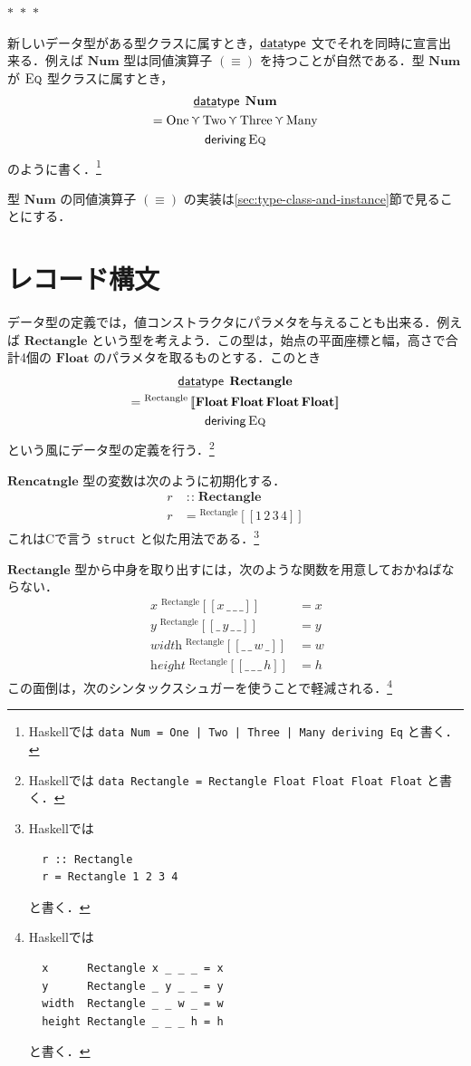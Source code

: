 \documentclass[a4paper,twocolumn]{jsbook}
\def\[{\left[\!\left[}
\def\]{\right]\!\right]}
\newcommand{\separator}{\begin{center}$*$~$*$~$*$\end{center}}
\newcommand{\programminglanguage}[1]{\textsf{#1}}
\newcommand{\clang}{\programminglanguage{C}}
\newcommand{\haskell}{\programminglanguage{Haskell}}
\newcommand{\code}[1]{\texttt{#1}}
\newcommand{\mKeyword}[1]{\mathsf{#1}} %
\newcommand{\mKeywordUnderline}[1]{\text{\underline{\textsf{#1}}}} %
\newcommand{\mDataTypeKeyword}{\mKeywordUnderline{data}\mKeyword{type}}
\newcommand{\mDerivingKeyword}{\mKeyword{deriving}}
\DeclareMathOperator{\mDataType}{\mDataTypeKeyword}
\DeclareMathOperator{\mDeriving}{\mDerivingKeyword}
\newcommand{\mSpecialConstant}[1]{\textrm{#1}} %
\newcommand{\mNumOne}{\mSpecialConstant{One}}
\newcommand{\mNumTwo}{\mSpecialConstant{Two}}
\newcommand{\mNumThree}{\mSpecialConstant{Three}}
\newcommand{\mNumMany}{\mSpecialConstant{Many}}
\newcommand{\mAnyParam}{\_}
\newcommand{\mFunc}[1]{\mathop{\mathit{#1}}}
\DeclareMathOperator{\mIn}{{:\!:}}
\DeclareMathOperator{\mValueOr}{\curlyvee}
\newcommand{\mType}[1]{\mathbf{#1}}
\newcommand{\mFloatType}{\mType{Float}}
\newcommand{\mGenericValueConstructor}[1]{\mathrm{#1}}
\newcommand{\mGenericWith}[2]{{}^\mGenericValueConstructor{#1}\[#2\]}
\newcommand{\mGenericTypeClass}[1]{\textsc{#1}} %
\newcommand{\mEqTypeClass}{\mGenericTypeClass{Eq}}
\begin{document}
\separator

新しいデータ型がある型クラスに属すとき，$\mDataType$ 文でそれを同時に宣言出来る．例えば $\mType{Num}$ 型は同値演算子 $(\equiv)$ を持つことが自然である．型 $\mType{Num}$ が $\mEqTypeClass$ 型クラスに属すとき，
\begin{multline}
\mDataType\;\mType{Num}\\
=\mNumOne\mValueOr\mNumTwo\mValueOr\mNumThree\mValueOr\mNumMany\\
\mDeriving\mEqTypeClass
\end{multline}
のように書く．\footnote{\haskell では \code{data Num = One | Two | Three | Many deriving Eq} と書く．}

型 $\mType{Num}$ の同値演算子 $(\equiv)$ の実装は\ref{sec:type-class-and-instance}節で見ることにする．

\section{レコード構文}

データ型の定義では，値コンストラクタにパラメタを与えることも出来る．例えば $\mType{Rectangle}$ という型を考えよう．この型は，始点の平面座標と幅，高さで合計4個の $\mFloatType$ のパラメタを取るものとする．このとき
\begin{multline}
\label{eq:rectangle}
\mDataType\;\mType{Rectangle}\\
=\mGenericWith{Rectangle}{\mFloatType\,\mFloatType\,
  \mFloatType\,\mFloatType}\\
\mDeriving\mEqTypeClass
\end{multline}
という風にデータ型の定義を行う．\footnote{\haskell では \code{data Rectangle = Rectangle Float Float Float Float} と書く．}

$\mType{Rencatngle}$ 型の変数は次のように初期化する．
\begin{align}
r&\mIn\mType{Rectangle}\\
r&=\mGenericWith{Rectangle}{1\,2\,3\,4}
\end{align}
これは\clang で言う \code{struct} と似た用法である．\footnote{\haskell では
\begin{verbatim}
  r :: Rectangle
  r = Rectangle 1 2 3 4
\end{verbatim}
と書く．
}

$\mType{Rectangle}$ 型から中身を取り出すには，次のような関数を用意しておかねばならない．
\begin{align}
\mFunc{x}\mGenericWith{Rectangle}{x\,\mAnyParam\,\mAnyParam\,\mAnyParam}&=x\\
\mFunc{y}\mGenericWith{Rectangle}{\mAnyParam\,y\,\mAnyParam\,\mAnyParam}&=y\\
\mFunc{width}\mGenericWith{Rectangle}{\mAnyParam\,\mAnyParam\,w\,\mAnyParam}&=w\\
\mFunc{height}\mGenericWith{Rectangle}{\mAnyParam\,\mAnyParam\,\mAnyParam\,h}&=h
\end{align}
この面倒は，次のシンタックスシュガーを使うことで軽減される．\footnote{\haskell では
\begin{verbatim}
  x      Rectangle x _ _ _ = x
  y      Rectangle _ y _ _ = y
  width  Rectangle _ _ w _ = w
  height Rectangle _ _ _ h = h
\end{verbatim}
と書く．}
\end{document}
